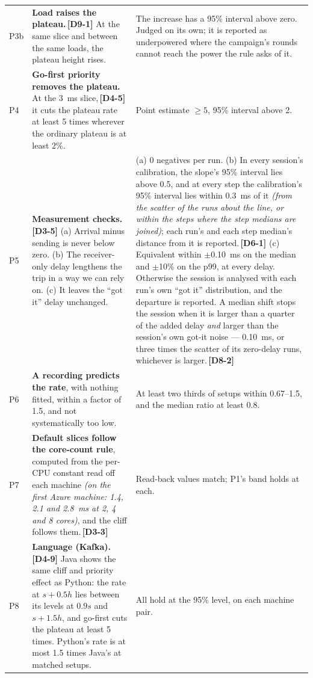 \documentclass[11pt]{article}
\newcommand{\gl}[1]{{\color{soft}\itshape\small (#1)}}
\newcommand{\chgold}[1]{\,{\color{oldcol}\bfseries\footnotesize[#1]}}
\begin{document}
{\begin{longtable}{@{}p{1.0cm} p{9.5cm} p{5.6cm}@{}}
P3b & \textbf{Load raises the plateau.}\chgold{D9-1} At the same slice and between the same loads, the plateau height rises. & The increase has a 95\% interval above zero. Judged on its own; it is reported as underpowered where the campaign's rounds cannot reach the power the rule asks of it. \\
P4 & \textbf{Go-first priority removes the plateau.} At the 3~ms slice,\chgold{D4-5} it cuts the plateau rate at least 5 times wherever the ordinary plateau is at least 2\%. & Point estimate $\ge 5$, 95\% interval above 2. \\
P5 & \textbf{Measurement checks.}\chgold{D3-5} (a) Arrival minus sending is never below zero. (b) The receiver-only delay lengthens the trip in a way we can rely on. (c) It leaves the ``got it'' delay unchanged. & (a) 0 negatives per run. (b) In every session's calibration, the slope's 95\% interval lies above 0.5, and at every step the calibration's 95\% interval lies within 0.3~ms of it \gl{from the scatter of the runs about the line, or within the steps where the step medians are joined}; each run's and each step median's distance from it is reported.\chgold{D6-1} (c) Equivalent within $\pm$0.10~ms on the median and $\pm$10\% on the p99, at every delay. Otherwise the session is analysed with each run's own ``got it'' distribution, and the departure is reported. A median shift stops the session when it is larger than a quarter of the added delay \emph{and} larger than the session's own got-it noise --- 0.10~ms, or three times the scatter of its zero-delay runs, whichever is larger.\chgold{D8-2} \\
P6 & \textbf{A recording predicts the rate}, with nothing fitted, within a factor of 1.5, and not systematically too low. & At least two thirds of setups within 0.67--1.5, and the median ratio at least 0.8. \\
P7 & \textbf{Default slices follow the core-count rule}, computed from the per-CPU constant read off each machine \gl{on the first Azure machine: 1.4, 2.1 and 2.8~ms at 2, 4 and 8 cores}, and the cliff follows them.\chgold{D3-3} & Read-back values match; P1's band holds at each. \\
P8 & \textbf{Language (Kafka).}\chgold{D4-9} Java shows the same cliff and priority effect as Python: the rate at $s + 0.5h$ lies between its levels at $0.9s$ and $s + 1.5h$, and go-first cuts the plateau at least 5 times. Python's rate is at most 1.5 times Java's at matched setups. & All hold at the 95\% level, on each machine pair. \\

\end{longtable}}
\end{document}
